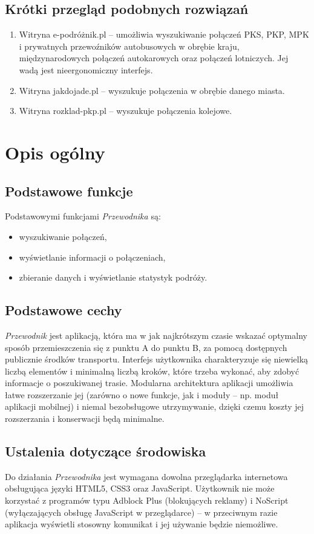 \documentclass[12pt,a4paper]{report}
\begin{document}
\subsection{Krótki przegląd podobnych rozwiązań}
\begin{enumerate}
	\item Witryna e-podróżnik.pl -- umożliwia wyszukiwanie połączeń PKS, PKP, MPK i prywatnych przewoźników autobusowych w obrębie kraju, międzynarodowych połączeń autokarowych oraz połączeń lotniczych. Jej wadą jest nieergonomiczny interfejs.
	\item Witryna jakdojade.pl -- wyszukuje połączenia w obrębie danego miasta.
	\item Witryna rozklad-pkp.pl -- wyszukuje połączenia kolejowe.
\end{enumerate}
\newpage
\section{Opis ogólny}
\subsection{Podstawowe funkcje}
	Podstawowymi funkcjami \emph{Przewodnika} są:
	\begin{itemize}
	 	\item wyszukiwanie połączeń,
	 	\item wyświetlanie informacji o połączeniach,
	 	\item zbieranie danych i wyświetlanie statystyk podróży.
	\end{itemize}
\subsection{Podstawowe cechy}
	\emph{Przewodnik} jest aplikacją, która ma w jak najkrótszym czasie wskazać optymalny sposób przemieszczenia się z punktu A do punktu B, za pomocą dostępnych publicznie środków transportu. Interfejs użytkownika charakteryzuje się niewielką liczbą elementów i minimalną liczbą kroków, które trzeba wykonać, aby zdobyć informacje o poszukiwanej trasie. Modularna architektura aplikacji umożliwia łatwe rozszerzanie jej (zarówno o nowe funkcje, jak i moduły -- np. moduł aplikacji mobilnej) i niemal bezobsługowe utrzymywanie, dzięki czemu koszty jej rozszerzania i konserwacji będą minimalne.
\subsection{Ustalenia dotyczące środowiska}
	Do działania \emph{Przewodnika} jest wymagana dowolna przeglądarka internetowa obsługująca języki HTML5, CSS3 oraz JavaScript. Użytkownik nie może korzystać z programów typu Adblock Plus (blokujących reklamy) i NoScript (wyłączających obsługę JavaScript w przeglądarce) -- w przeciwnym razie aplikacja wyświetli stosowny komunikat i jej używanie będzie niemożliwe.
\end{document}
